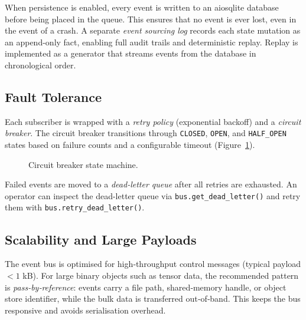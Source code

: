 When persistence is enabled, every event is written to an aiosqlite database
before being placed in the queue.  This ensures that no event is ever lost,
even in the event of a crash.  A separate \emph{event sourcing log} records
each state mutation as an append-only fact, enabling full audit trails and
deterministic replay.  Replay is implemented as a generator that streams
events from the database in chronological order.

\subsection{Fault Tolerance}

Each subscriber is wrapped with a \emph{retry policy} (exponential backoff)
and a \emph{circuit breaker}.  The circuit breaker transitions through
\texttt{CLOSED}, \texttt{OPEN}, and \texttt{HALF\_OPEN} states based on
failure counts and a configurable timeout (Figure~\ref{fig:circuit}).

\begin{figure}[htbp]
\centering
{}
\caption{Circuit breaker state machine.}
\label{fig:circuit}
\end{figure}

Failed events are moved to a \emph{dead-letter queue} after all retries are
exhausted.  An operator can inspect the dead-letter queue via
\texttt{bus.get\_dead\_letter()} and retry them with
\texttt{bus.retry\_dead\_letter()}.

\subsection{Scalability and Large Payloads}

The event bus is optimised for high‑throughput control messages (typical
payload $< 1$ kB).  For large binary objects such as tensor data, the
recommended pattern is \emph{pass‑by‑reference}: events carry a file
path, shared‑memory handle, or object store identifier, while the bulk
data is transferred out‑of‑band.  This keeps the bus responsive and
avoids serialisation overhead.

